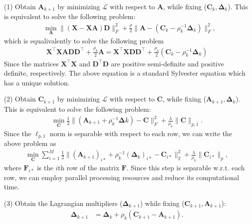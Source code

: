 \documentclass[10pt,twocolumn,letterpaper]{article}
\begin{document}
(1) Obtain $\bm{A}_{k+1}$ by minimizing $\mathcal{L}$ with respect to $\bm{A}$, while fixing ($\bm{C}_{k},\bm{\Delta}_{k}$). This is equivalent to solve the following problem:
\begin{equation}
\begin{split}
\label{e8}
&
\min_{\bm{A}}
\|
(\bm{X}
-
\bm{X}\bm{A})
\bm{D}
\|_{F}^{2}
+
\frac{\rho}{2}
\|
\bm{A}
-(
\bm{C}_{k}
-
\rho_{k}^{-1}
\bm{\Delta}_{k}
)
\|_{F}^{2},
\end{split}
\end{equation}
which is equalivalently to solve the following problem
\begin{equation}
\begin{split}
\label{e8}
\bm{X}^{\top}\bm{X}\bm{A}\bm{D}\bm{D}^{\top}
+
\frac{\rho_{k}}{2}
\bm{A}
=
\bm{X}^{\top}\bm{X}\bm{D}\bm{D}^{\top}
+
\frac{\rho_{k}}{2}
(
\bm{C}_{k}
-
\rho_{k}^{-1}
\bm{\Delta}_{k}
)
\end{split}
\end{equation}
Since the matrices $\bm{X}^{\top}\bm{X}$ and $\bm{D}^{\top}\bm{D}$ are positive semi-definite and positive definite, respectively. The above equation is a standard Sylvester equation which has a unique solution.


(2) Obtain $\bm{C}_{k+1}$ by minimizing $\mathcal{L}$ with respect to $\bm{C}$, while fixing ($\bm{A}_{k+1},\bm{\Delta}_{k}$). This is equivalent to solve the following problem:
\begin{equation}
\begin{split}
\label{e6}
\min_{\bm{C}}
\frac{1}{2}
\|
(\bm{A}_{k+1}+\rho_{k}^{-1}\bm{\Delta}{k})
-
\bm{C}
\|_{F}^{2}
+
\frac{\lambda}{\rho_{k}}
\|
\bm{C}
\|_{p,1}.
\end{split}
\end{equation}
Since the $\ell_{p,1}$ norm is separable with respect to each row, we can write the above problem as 
\begin{equation}
\begin{split}
\label{e6}
\min_{\bm{C}}
\sum_{i=1}^{M}
\frac{1}{2}
\|
(\bm{A}_{k+1})_{i*}+\rho_{k}^{-1}(\bm{\Delta}_{k})_{i*}
-
\bm{C}_{i*}
\|_{2}^{2}
+
\frac{\lambda}{\rho_{k}}
\|
\bm{C}_{i*}
\|_{p},
\end{split}
\end{equation}
where $\bm{F}_{i*}$ is the $i$th row of the matrix $\bm{F}$. Since this step is separable w.r.t. each row, we can employ parallel processing resources and reduce its computational time.


(3) Obtain the Lagrangian multipliers ($\bm{\Delta}_{k+1}$) while fixing ($\bm{C}_{k+1},\bm{A}_{k+1}$):
\begin{equation}
\begin{split}
\label{e10}
\bm{\Delta}_{k+1}
&
=
\bm{\Delta}_{k}
+
\rho_{k}
(\bm{C}_{k+1}-\bm{A}_{k+1})
.
\end{split}
\end{equation}
\end{document}

